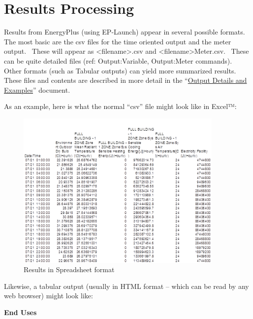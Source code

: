 \section{Results Processing}\label{results-processing}

Results from EnergyPlus (using EP-Launch) appear in several possible formats.~ The most basic are the csv files for the time oriented output and the meter output.~ These will appear as \textless{}filename\textgreater{}.csv and \textless{}filename\textgreater{}Meter.csv.~ These can be quite detailed files (ref: Output:Variable, Output:Meter commands).~ Other formats (such as Tabular outputs) can yield more summarized results.~ These files and contents are described in more detail in the ``\href{file:///E:/Docs4PDFs/OutputDetailsAndExamples.pdf}{Output Details and Examples}'' document.

As an example, here is what the normal ``csv'' file might look like in Excel™:

\begin{figure}[hbtp] %
\centering
\includegraphics[width=0.9\textwidth, height=0.9\textheight, keepaspectratio=true]{media/image023.png}
\caption{Results in Spreadsheet format \protect \label{fig:results-in-spreadsheet-format}}
\end{figure}

Likewise, a tabular output (usually in HTML format -- which can be read by any web browser) might look like:

\textbf{End Uses}

